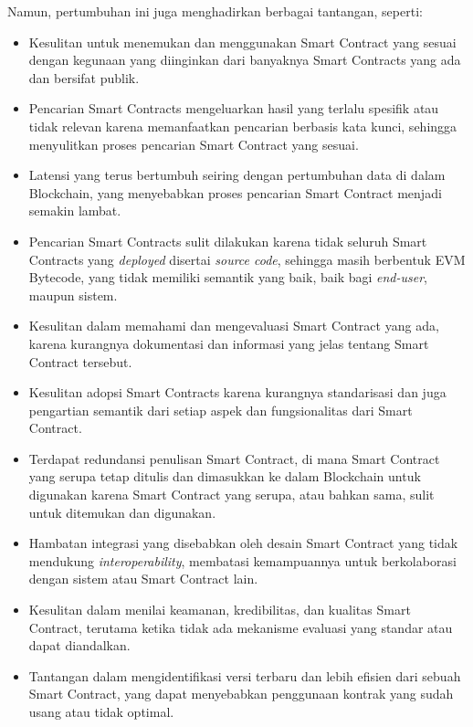 Namun, pertumbuhan ini juga menghadirkan berbagai tantangan, seperti:
\begin{itemize}
    \item Kesulitan untuk menemukan dan menggunakan Smart Contract yang sesuai dengan kegunaan yang diinginkan dari banyaknya Smart Contracts yang ada dan bersifat publik.
    \item Pencarian Smart Contracts mengeluarkan hasil yang terlalu spesifik atau tidak relevan karena memanfaatkan pencarian berbasis kata kunci, sehingga menyulitkan proses pencarian Smart Contract yang sesuai.
    \item Latensi yang terus bertumbuh seiring dengan pertumbuhan data di dalam Blockchain, yang menyebabkan proses pencarian Smart Contract menjadi semakin lambat.
    \item Pencarian Smart Contracts sulit dilakukan karena tidak seluruh Smart Contracts yang \textit{deployed} disertai \textit{source code}, sehingga masih berbentuk EVM Bytecode, yang tidak memiliki semantik yang baik, baik bagi \textit{end-user}, maupun sistem.
    \item Kesulitan dalam memahami dan mengevaluasi Smart Contract yang ada, karena kurangnya dokumentasi dan informasi yang jelas tentang Smart Contract tersebut.
    \item Kesulitan adopsi Smart Contracts karena kurangnya standarisasi dan juga pengartian semantik dari setiap aspek dan fungsionalitas dari Smart Contract.
    \item Terdapat redundansi penulisan Smart Contract, di mana Smart Contract yang serupa tetap ditulis dan dimasukkan ke dalam Blockchain untuk digunakan karena Smart Contract yang serupa, atau bahkan sama, sulit untuk ditemukan dan digunakan.
    \item Hambatan integrasi yang disebabkan oleh desain Smart Contract yang tidak mendukung \textit{interoperability}, membatasi kemampuannya untuk berkolaborasi dengan sistem atau Smart Contract lain.
    \item Kesulitan dalam menilai keamanan, kredibilitas, dan kualitas Smart Contract, terutama ketika tidak ada mekanisme evaluasi yang standar atau dapat diandalkan.
    \item Tantangan dalam mengidentifikasi versi terbaru dan lebih efisien dari sebuah Smart Contract, yang dapat menyebabkan penggunaan kontrak yang sudah usang atau tidak optimal.
\end{itemize}

